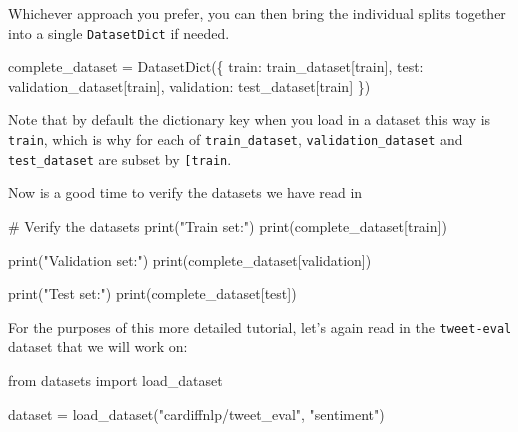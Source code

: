 \documentclass[
  letterpaper,
  DIV=11,
  numbers=noendperiod]{scrreprt}
\newenvironment{Shaded}{\begin{snugshade}}{\end{snugshade}}
\newcommand{\BuiltInTok}[1]{\textcolor[rgb]{0.00,0.23,0.31}{#1}}
\newcommand{\CommentTok}[1]{\textcolor[rgb]{0.37,0.37,0.37}{#1}}
\newcommand{\ImportTok}[1]{\textcolor[rgb]{0.00,0.46,0.62}{#1}}
\newcommand{\NormalTok}[1]{\textcolor[rgb]{0.00,0.23,0.31}{#1}}
\newcommand{\OperatorTok}[1]{\textcolor[rgb]{0.37,0.37,0.37}{#1}}
\newcommand{\StringTok}[1]{\textcolor[rgb]{0.13,0.47,0.30}{#1}}
\begin{document}
Whichever approach you prefer, you can then bring the individual splits
together into a single \texttt{DatasetDict} if needed.

\begin{Shaded}
\begin{Highlighting}[]
\NormalTok{complete\_dataset }\OperatorTok{=}\NormalTok{ DatasetDict(\{}
    \StringTok{\textquotesingle{}train\textquotesingle{}}\NormalTok{: train\_dataset[}\StringTok{\textquotesingle{}train\textquotesingle{}}\NormalTok{],}
    \StringTok{\textquotesingle{}test\textquotesingle{}}\NormalTok{: validation\_dataset[}\StringTok{\textquotesingle{}train\textquotesingle{}}\NormalTok{],}
    \StringTok{\textquotesingle{}validation\textquotesingle{}}\NormalTok{: test\_dataset[}\StringTok{\textquotesingle{}train\textquotesingle{}}\NormalTok{]}
\NormalTok{\})}
\end{Highlighting}
\end{Shaded}

Note that by default the dictionary key when you load in a dataset this
way is \texttt{train}, which is why for each of \texttt{train\_dataset},
\texttt{validation\_dataset} and \texttt{test\_dataset} are subset by
\texttt{{[}\textquotesingle{}train\textquotesingle{}{]}}.

Now is a good time to verify the datasets we have read in

\begin{Shaded}
\begin{Highlighting}[]
\CommentTok{\# Verify the datasets}
\BuiltInTok{print}\NormalTok{(}\StringTok{"Train set:"}\NormalTok{)}
\BuiltInTok{print}\NormalTok{(complete\_dataset[}\StringTok{\textquotesingle{}train\textquotesingle{}}\NormalTok{])}

\BuiltInTok{print}\NormalTok{(}\StringTok{"Validation set:"}\NormalTok{)}
\BuiltInTok{print}\NormalTok{(complete\_dataset[}\StringTok{\textquotesingle{}validation\textquotesingle{}}\NormalTok{])}

\BuiltInTok{print}\NormalTok{(}\StringTok{"Test set:"}\NormalTok{)}
\BuiltInTok{print}\NormalTok{(complete\_dataset[}\StringTok{\textquotesingle{}test\textquotesingle{}}\NormalTok{])}
\end{Highlighting}
\end{Shaded}

For the purposes of this more detailed tutorial, let's again read in the
\texttt{tweet-eval} dataset that we will work on:

\begin{Shaded}
\begin{Highlighting}[]
\ImportTok{from}\NormalTok{ datasets }\ImportTok{import}\NormalTok{ load\_dataset}

\NormalTok{dataset }\OperatorTok{=}\NormalTok{ load\_dataset(}\StringTok{"cardiffnlp/tweet\_eval"}\NormalTok{, }\StringTok{"sentiment"}\NormalTok{)}
\end{Highlighting}
\end{Shaded}
\end{document}
